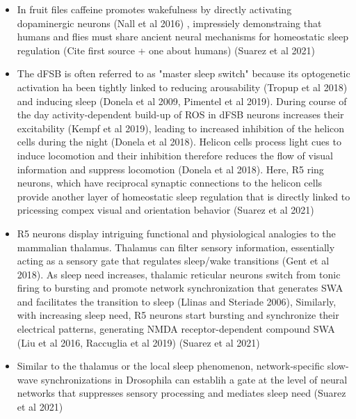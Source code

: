 \documentclass[11pt]{article}
\begin{document}
\begin{itemize}
    \item In fruit files caffeine promotes wakefulness by directly activating dopaminergic neurons
    (Nall et al 2016) \parencite{suarez-grimaltNeuralArchitectureSleep2021}, impressiely demonstraing that humans and flies
    must share ancient neural mechanisms for homeostatic sleep regulation \parencite{suarez-grimaltNeuralArchitectureSleep2021}
    (Cite first source + one about humans)
    (Suarez et al 2021)

    \item The dFSB is often referred to as "master sleep switch" because its optogenetic activation ha been tightly
    linked to reducing arousability (Tropup et al 2018) and inducing sleep (Donela et al 2009, Pimentel et al 2019).
    During course of the day activity-dependent build-up of ROS in dFSB neurons increases their excitability (Kempf et al 2019),
    leading to increased inhibition of the helicon cells during the night (Donela et al 2018). Helicon cells process
    light cues to induce locomotion and their inhibition therefore reduces the flow of visual information and
    suppress locomotion (Donela et al 2018). Here, R5 ring neurons, which have reciprocal synaptic connections to the
    helicon cells provide another layer of homeostatic sleep regulation that is directly linked to pricessing
    compex visual and orientation behavior \parencite{suarez-grimaltNeuralArchitectureSleep2021}
    (Suarez et al 2021)

    \item R5 neurons display intriguing functional and physiological analogies to the mammalian thalamus.
    Thalamus can filter sensory information, essentially acting as a sensory gate that regulates sleep/wake transitions
    (Gent et al 2018). As sleep need increases, thalamic reticular neurons switch from tonic firing to bursting and promote network
    synchronization that generates SWA and facilitates the transition to sleep (Llinas and Steriade 2006), Similarly,
    with increasing sleep need, R5 neurons start bursting and synchronize their electrical patterns, generating
    NMDA receptor-dependent compound SWA (Liu et al 2016, Raccuglia et al 2019) \parencite{suarez-grimaltNeuralArchitectureSleep2021}
    (Suarez et al 2021)

    \item Similar to the thalamus or the local sleep phenomenon, network-specific slow-wave synchronizations in Drosophila
    can establih a gate at the level of neural networks that suppresses sensory processing and mediates sleep need \parencite{suarez-grimaltNeuralArchitectureSleep2021}
    (Suarez et al 2021)


\end{itemize}
\end{document}
